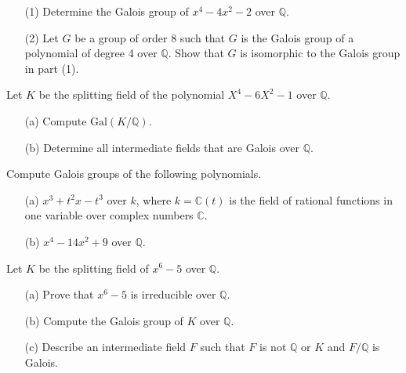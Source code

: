 \begin{prob}[F2016-Q4]
    \phantom{text}
    \begin{itemize}
        \item[(1)] Determine the Galois group of \(x^{4}-4x^{2}-2\) over \(\mathbb{Q}\).
        \item[(2)] Let \(G\) be a group of order 8 such that \(G\) is the Galois group of a polynomial of degree 4 over \(\mathbb{Q}\). Show that \(G\) is isomorphic to the Galois group in part (1).
    \end{itemize}
\end{prob}


\begin{prob}[S2008-Q3]
    Let \(K\) be the splitting field of the polynomial \(X^4 - 6X^2 - 1\) over \(\mathbb{Q}\).
    \begin{itemize}
        \item[(a)] Compute \(\text{Gal}(K/\mathbb{Q})\).
        \item[(b)] Determine all intermediate fields that are Galois over \(\mathbb{Q}\).
    \end{itemize}
\end{prob}


\begin{prob}[S2010-Q3]
    Compute Galois groups of the following polynomials.
    \begin{itemize}
        \item[(a)] \(x^3 + t^2x - t^3\) over \(k\), where \(k = \mathbb{C}(t)\) is the field of rational functions in one variable over complex numbers \(\mathbb{C}\).
        \item[(b)] \(x^4 - 14x^2 + 9\) over \(\mathbb{Q}\).
    \end{itemize}
\end{prob}

\begin{prob}[S2013-Q6]
    Let \(K\) be the splitting field of \(x^6 - 5\) over \(\mathbb{Q}\).
    \begin{itemize}
        \item[(a)] Prove that \(x^6 - 5\) is irreducible over \(\mathbb{Q}\).
        \item[(b)] Compute the Galois group of \(K\) over \(\mathbb{Q}\).
        \item[(c)] Describe an intermediate field \(F\) such that \(F\) is not \(\mathbb{Q}\) or \(K\) and \(F/\mathbb{Q}\) is Galois.
    \end{itemize}
\end{prob}

